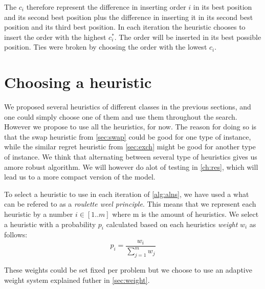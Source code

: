 \documentclass[../main.tex]{subfiles}
\begin{document}
The $c_i$ therefore represent the difference in inserting order $i$ in its best position and its second best position plus the difference in inserting it in its second best position and its third best position. In each iteration the heuristic chooses to insert the order with the highest $c^*_i$. The order will be inserted in its best possible position. Ties were broken by choosing the order with the lowest $c_i$.

\section{Choosing a heuristic}
\label{sec:choosing}
We proposed several heuristics of different classes in the previous sections, and one could simply choose one of them and use them throughout the search. 
However we propose to use all the heuristics, for now. 
The reason for doing so is that the swap heuristic from \cref{sec:swap} could be good for one type of instance, while the similar regret heuristic from \cref{sec:exch} might be good for another type of instance. 
We think that alternating between several type of heuristics gives us amore robust algorithm. 
We will however do alot of testing in \cref{ch:res}, which will lead us to a more compact version of the model. \par
To select a heuristic to use in each iteration of \cref{alg:alns}, we have used a what can be refered to as a \emph{roulette weel principle}. 
This means that we represent each heuristic by a number $i \in [1..m]$ where m is the amount of heuristics. 
We select a heuristic with a probability $p_i$ calculated based on each heuristics \textit{weight} $w_i$ as follows:
\begin{equation}\label{eq:weights}
    p_i=\dfrac{w_i}{\sum_{j=1}^m w_j}
\end{equation}

These weights could be set fixed per problem but we choose to use an adaptive weight system explained futher in \cref{sec:weight}.
\end{document}
